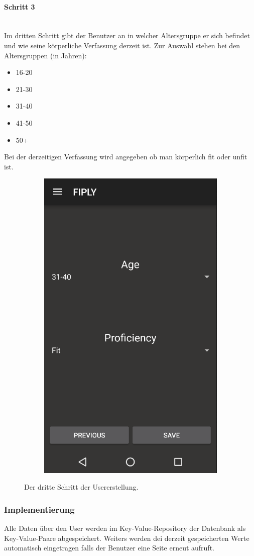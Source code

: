 \documentclass[FIPLY_base.tex]{subfiles}
\begin{document}
\paragraph{Schritt 3}\ \\
Im dritten Schritt gibt der Benutzer an in welcher Altersgruppe er sich befindet und wie seine körperliche Verfassung derzeit ist.
Zur Auswahl stehen bei den Altersgruppen (in Jahren):
\begin{itemize}
\item 16-20
\item 21-30
\item 31-40
\item 41-50
\item 50+
\end{itemize}
Bei der derzeitigen Verfassung wird angegeben ob man körperlich fit oder unfit ist.

\begin{figure}[H]
	\begin{subfigure}[b]{0.3\textwidth}
	\includegraphics[scale=0.55]{img/User_step3}
	\end{subfigure}
	\hfil
	\caption{Der dritte Schritt der Usererstellung.}
\end{figure}

\newpage

\subsubsection{Implementierung}
Alle Daten über den User werden im Key-Value-Repository der Datenbank als Key-Value-Paare abgespeichert. 
Weiters werden dei derzeit gespeicherten Werte automatisch eingetragen falls der Benutzer eine Seite erneut aufruft.
\end{document}
